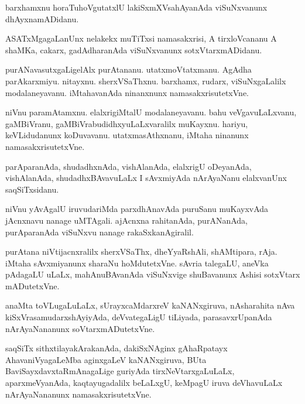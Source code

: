 \documentclass{article}
\begin{document}
\begin{mn}%
barxhamxnu horaTuhoVgutatxlU lakiSxmXVsahAyanAda viSuNxvanunx dhAyxnamADidanu.
\end{mn}

\begin{mn}
ASATxMgagaLanUnx nelakekx muTiTxsi namasakxrisi, A tirxloVcananu A
shaMKa, cakarx, gadAdharanAda viSuNxvanunx sotxVtarxmADidanu.
\end{mn}

\begin{mn}
purANavasutxgaLigelAlx purAtananu. utatxmoVtatxmanu. AgAdha
parAkarxmiyu. nitayxnu. sherxVSaThxnu. barxhamx, rudarx,
viSuNxgaLalilx modalaneyavanu. iMtahavanAda ninanxnunx namasakxrisutetxVne.
\end{mn}

\begin{mn}
niVnu paramAtamxnu. elalxrigiMtalU modalaneyavanu. bahu
veVgavuLaLxvanu, gaMBiVranu, gaMBiVrabudidhxyuLaLxvaralilx
muKayxnu. hariyu, keVLidudanunx koDuvavanu. utatxmasAthxnanu, iMtaha
ninanunx namasakxrisutetxVne.
\end{mn}

\begin{mn}%
parAparanAda, shudadhxnAda, vishAlanAda, elalxrigU oDeyanAda,
vishAlanAda, shudadhxBAvavuLaLx I sAvxmiyAda nArAyaNanu elalxvanUnx saqSiTxsidanu.
\end{mn}

\begin{mn}
niVnu yAvAgalU iruvudariMda parxdhAnavAda puruSanu muKayxvAda
jAcnxnavu nanage uMTAgali. ajAcnxna rahitanAda, purANanAda,
purAparanAda viSuNxvu nanage rakaSxkanAgiralil.
\end{mn}

\begin{mn}
purAtana niVtijacnxralilx sherxVSaThx, dheYyaRshAli, shAMtipara,
rAja. iMtaha sAvxmiyanunx sharaNu hoMdutetxVne. sAvria talegaLU,
aneVka pAdagaLU uLaLx, mahAnuBAvanAda viSuNxvige shuBavanunx Ashisi
sotxVtarx mADutetxVne.
\end{mn}

\begin{mn}
anaMta toVLugaLuLaLx, sUrayxcaMdarxreV kaNANxgiruva, nAsharahita nAva
kiSxVrasamudarxshAyiyAda, deVvategaLigU tiLiyada, parasavxrUpanAda
nArAyaNananunx soVtarxmADutetxVne.
\end{mn}

\begin{mn}
saqSiTx sithxtilayakArakanAda, dakiSxNAginx gAhaRpatayx
AhavaniVyagaLeMba aginxgaLeV kaNANxgiruva, BUta
BaviSayxdavxtaRmAnagaLige guriyAda tirxNeVtarxgaLuLaLx,
aparxmeVyanAda, kaqtayugadalilx beLaLxgU, keMpagU iruva deVhavuLaLx
nArAyaNananunx namasakxrisutetxVne.
\end{mn}
\end{document}
